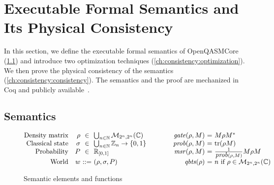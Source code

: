 \chapter{Executable Formal Semantics and Its Physical Consistency}
\label{ch:consistency}

\noindent
In this section, we define the executable formal semantics of OpenQASMCore
(\cref{ch:consistency:semantics}) and introduce two optimization techniques
(\cref{ch:consistency:optimization}).
%
We then prove the physical consistency of the semantics
(\cref{ch:consistency:consistency}).
%
The semantics and the proof are mechanized in Coq and publicly
available~\cite{artifact}.

\section{Semantics}
\label{ch:consistency:semantics}

\begin{figure}[t]
	\[
		\begin{array}{@{}rr@{~}c@{~}l@{\qquad\qquad}r@{~}c@{~}l@{}}
			\text{Density matrix}  & \rho   & \in                                                    & \bigcup_{n\in\mathbb{N}}\mathcal{M}_{2^n,2^n}(\mathbb{C}) &
			\sunitary{\rho}{M}     & =      & M\rho M^*                                                                                                            \\
			\text{Classical state} & \sigma & \in                                                    & \bigcup_{n\in\mathbb{N}}\mathbb{Z}_n\rightarrow \{0,1\}   &
			\sprob{\rho}{M}        & =      & \trace{\rho M}                                                                                                       \\
			\text{Probability}     & P      & \in                                                    & \mathbb{R}_{[0,1]}                                        &
			\smeasure{\rho}{M}     & =      & \frac{1}{\sprob{\rho}{M}}M\rho M                                                                                     \\
			\text{World}           & w      & ::=                                                    & (\rho,\sigma,P)                                           &
			\qubits{\rho}          & =      & n\ \text{if}\ \rho\in\mathcal{M}_{2^n,2^n}(\mathbb{C})
		\end{array}
	\]
	\caption{Semantic elements and functions}
	\label{fig:semantic-elements}
\end{figure}

